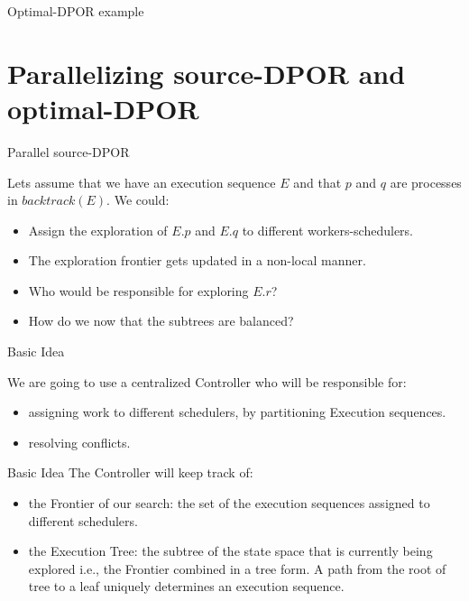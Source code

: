 \begin{frame} {Optimal-DPOR example}
\end{frame}

\section{Parallelizing source-DPOR and optimal-DPOR}

\begin{frame} {Parallel source-DPOR}

Lets assume that we have an execution sequence $E$ and that $p$ and $q$ are processes in $backtrack(E)$. We could:

\begin{itemize}[<+->]
  \item Assign the exploration of $E.p$ and $E.q$ to different workers-schedulers.
  \item The exploration frontier gets updated in a non-local manner.
  \item Who would be responsible for exploring $E.r$?
  \item How do we now that the subtrees are balanced?
\end{itemize}
 
\end{frame}

\begin{frame} {Basic Idea}

We are going to use a centralized Controller who will be responsible for:

\begin{itemize}[<+->]
  \item assigning work to different schedulers, by partitioning Execution sequences.
  \item resolving conflicts.
\end{itemize}
\end{frame}

\begin{frame} {Basic Idea}
The Controller will keep track of:

\begin{itemize}[<+->]
  \item the Frontier of our search: the set of the execution sequences assigned to different schedulers.
  \item the Execution Tree: the subtree of the state space that is currently being explored i.e., the Frontier combined in a tree form.
  A path from the root of tree to a leaf uniquely determines an execution sequence.
\end{itemize}

\end{frame}


